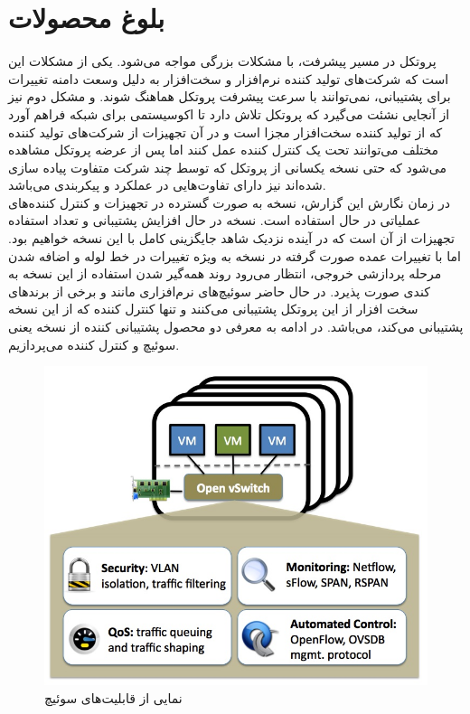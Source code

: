 \chapter{بلوغ محصولات}

پروتکل  در مسیر پیشرفت، با مشکلات بزرگی مواجه می‌شود. یکی از مشکلات این است که شرکت‌های تولید کننده نرم‌افزار و سخت‌افزار به دلیل وسعت دامنه تغییرات برای پشتیبانی، نمی‌توانند با سرعت پیشرفت پروتکل هماهنگ شوند. و مشکل دوم نیز از آنجایی نشئت می‌گیرد که پروتکل  تلاش دارد تا اکوسیستمی برای شبکه فراهم آورد که از تولید کننده سخت‌افزار مجزا است و در آن تجهیزات از شرکت‌های تولید کننده مختلف می‌توانند تحت یک کنترل کننده عمل کنند اما پس از عرضه پروتکل مشاهده می‌شود که حتی نسخه یکسانی از پروتکل که توسط چند شرکت متفاوت پیاده سازی شده‌اند نیز دارای تفاوت‌هایی در عملکرد و پیکربندی می‌باشد.\\
در زمان نگارش این گزارش، نسخه  به صورت گسترده در تجهیزات و کنترل کننده‌های عملیاتی در حال استفاده است. نسخه  در حال افزایش پشتیبانی و تعداد استفاده تجهیزات از آن است که در آینده نزدیک شاهد جایگزینی کامل  با این نسخه خواهیم بود. اما با تغییرات عمده صورت گرفته در نسخه  به ویژه تغییرات در خط لوله و اضافه شدن مرحله پردازشی خروجی، انتظار می‌رود روند همه‌گیر شدن استفاده از این نسخه به کندی صورت پذیرد. در حال حاضر سوئیچ‌های نرم‌افزاری مانند  و برخی از برند‌های سخت افزار از این پروتکل پشتیبانی می‌کنند و تنها کنترل کننده که از این نسخه پشتیبانی می‌کند،  می‌باشد. در ادامه به معرفی دو محصول پشتیبانی کننده از نسخه  یعنی سوئیچ  و کنترل کننده  می‌پردازیم.

\begin{figure}
	\centering
	\includegraphics[scale=0.3]{imgs/ovs.jpg}
	\caption{نمایی از قابلیت‌های سوئیچ  \cite{ovs}}
	\label{fig8}
\end{figure}


